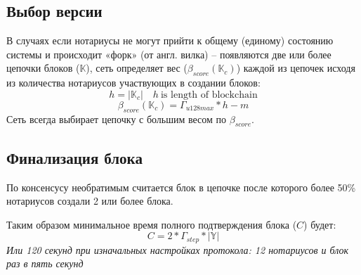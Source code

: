 \documentclass[12pt]{report}
\begin{document}
\subsection{Выбор версии}
\label{tech-blockchain-score}
\begin{multicols}{2}
В случаях если нотариусы не могут прийти к общему (единому) состоянию системы и происходит «форк» (от англ. вилка) – появляются две или более цепочки блоков ($\mathbb{K}$), сеть определяет вес ($\beta_{score}(\mathbb{K}_c)$) каждой из цепочек исходя из количества нотариусов участвующих в создании блоков:
\begin{equation}
h = |\mathbb{K}_c| \quad h \ \text{is length of blockchain}
\end{equation}
\begin{equation}
\beta_{score}(\mathbb{K}_c) = \Gamma_{u128max} * h - m
\end{equation}
Сеть всегда выбирает цепочку с большим весом по $\beta_{score}$.
\end{multicols}
\subsection{Финализация блока}
\label{tech-blockchain-fin}
\begin{multicols}{2}
По консенсусу необратимым считается блок в цепочке после которого более 50\% нотариусов создали 2 или более блока.

Таким образом минимальное время полного подтверждения блока ($C$) будет:
\begin{equation}
C = 2 * \Gamma_{step} * |\mathbb{Y}|
\end{equation}
\textit{Или 120 секунд при изначальных настройках протокола: 12 нотариусов и блок раз в пять секунд}
\end{multicols}
\end{document}
